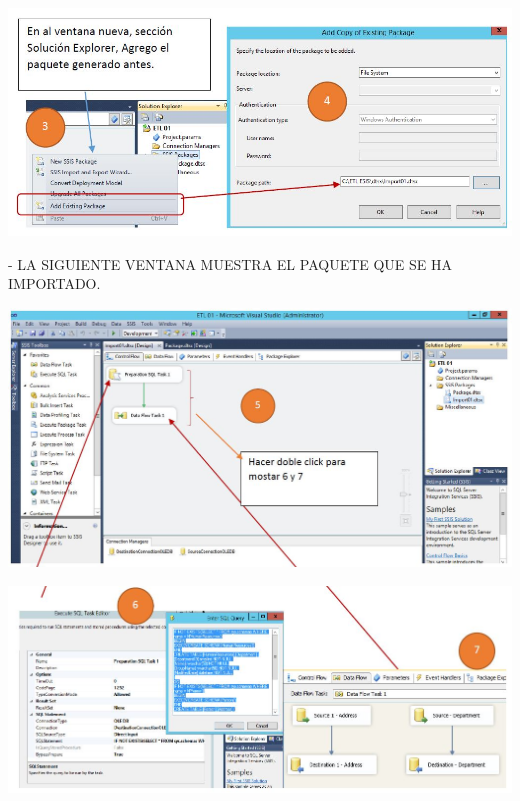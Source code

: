 \begin{itemize}
	\begin{center}
	\includegraphics[width=17cm]{./Imagenes/7}
	\end{center}	

- LA SIGUIENTE VENTANA MUESTRA EL PAQUETE QUE SE HA IMPORTADO.

	\begin{center}
	\includegraphics[width=17cm]{./Imagenes/8}
	\end{center}	

	\begin{center}
	\includegraphics[width=17cm]{./Imagenes/9}
	\end{center}	
\end{itemize}